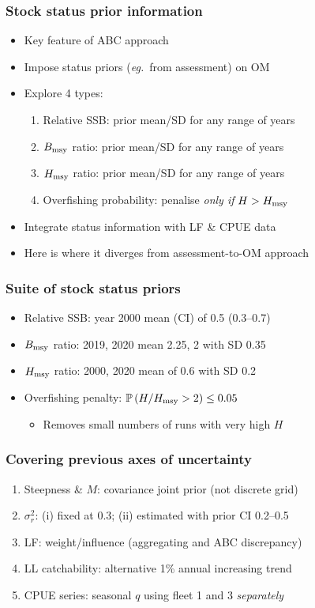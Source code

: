 \documentclass{beamer}
\newcommand{\sigr}{\sigma^2_r}
\newcommand{\bmsy}{B_{\rm msy}}
\newcommand{\hmsy}{H_{\rm msy}}
\newcommand{\eg}{\textit{eg.}~}
\begin{document}
\begin{frame}
\frametitle{Stock status prior information}
\begin{itemize}
    \item Key feature of ABC approach
    \item Impose status priors (\eg from assessment) on OM
    \item Explore 4 types:
        \vspace{0.25cm}
        \begin{enumerate}
            \item Relative SSB: prior mean/SD for any range of years
            \item $\bmsy$ ratio: prior mean/SD for any range of years
            \item $\hmsy$ ratio: prior mean/SD for any range of years
            \item Overfishing probability: penalise \emph{only if} $H>\hmsy$
        \end{enumerate}
        \vspace{0.25cm}
    \item Integrate status information with LF \& CPUE data
    \item Here is where it diverges from assessment-to-OM approach
\end{itemize}
\end{frame}
\begin{frame}
\frametitle{Suite of stock status priors}
\begin{itemize}
    \item Relative SSB: year 2000 mean (CI) of 0.5 (0.3--0.7)
    \item $\bmsy$ ratio: 2019, 2020 mean 2.25, 2 with SD 0.35
    \item $\hmsy$ ratio: 2000, 2020 mean of 0.6 with SD 0.2
    \item Overfishing penalty: $\mathbb{P}\left(H/\hmsy>2\right)\leq 0.05$ 
\begin{itemize}
    \item Removes small numbers of runs with very high $H$
\end{itemize}
\end{itemize}
\end{frame}
\begin{frame}
\frametitle{Covering previous axes of uncertainty}
\begin{enumerate}
    \item Steepness \& $M$: covariance joint prior (not discrete grid)
    \item $\sigr$: (i) fixed at 0.3; (ii) estimated with prior CI 0.2--0.5  
    \item LF: weight/influence (aggregating and ABC discrepancy) 
    \item LL catchability: alternative 1\% annual increasing trend
    \item CPUE series: seasonal $q$ using fleet 1 and 3 \emph{separately}
\end{enumerate}
\end{frame}
\end{document}

